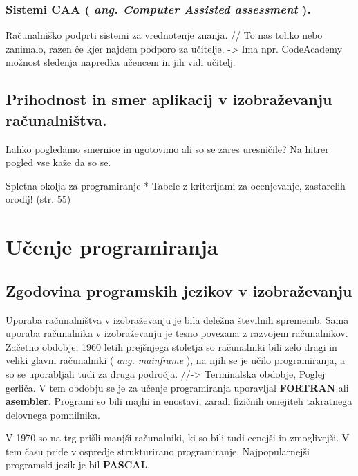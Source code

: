 \subsubsection{\texorpdfstring{Sistemi CAA ( \emph{ang. Computer
Assisted assessment}
).}{Sistemi CAA ( ang. Computer Assisted assessment ).}}\label{sistemi-caa-ang.-computer-assisted-assessment-.}

Računalniško podprti sistemi za vrednotenje znanja. // To nas toliko
nebo zanimalo, razen če kjer najdem podporo za učitelje. -\textgreater{}
Ima npr. CodeAcademy možnost sledenja napredka učencem in jih vidi
učitelj.

\subsection{Prihodnost in smer aplikacij v izobraževanju
računalništva.}\label{prihodnost-in-smer-aplikacij-v-izobraux17eevanju-raux10dunalniux161tva.}

Lahko pogledamo smernice in ugotovimo ali so se zares uresničile? Na
hitrer pogled vse kaže da so se.

Spletna okolja za programiranje * Tabele z kriterijami za ocenjevanje,
zastarelih orodij! (str. 55)

\section{Učenje programiranja}
\label{sec:učenje_programiranja}

\subsection{Zgodovina programskih jezikov v izobraževanju}
\label{sec:zgodovina_programskih_jezikov}

Uporaba računalništva v izobraževanju je bila deležna številnih
sprememb. Sama uporaba računalnika v izobraževanju je tesno
povezana z razvojem računalnikov.  Začetno obdobje, 1960 letih
prejšnjega stoletja so računalniki bili zelo dragi in veliki glavni
računalniki ( \emph{ang. mainframe} ), na njih se je učilo
programiranja, a so se uporabljali tudi za druga področja.
//-\textgreater{} Terminalska obdobje, Poglej gerliča. V tem obdobju
se je za učenje programiranja uporavljal \textbf{FORTRAN} ali
\textbf{asembler}. Programi so bili majhi in enostavi, zaradi fizičnih
omejiteh takratnega delovnega pomnilnika.

V 1970 so na trg prišli manjši računalniki, ki so bili tudi cenejši in
zmoglivejši. V tem času pride v ospredje strukturirano programiranje.
Najpopularnejši programski jezik je bil \textbf{PASCAL}.

